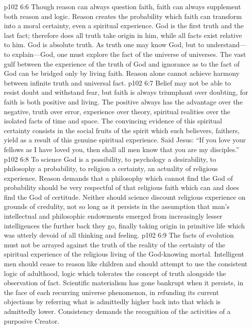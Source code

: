 \pc \vs p102 6:6 Though reason can always question faith, faith can always supplement both reason and logic. Reason creates the probability which faith can transform into a moral certainty, even a spiritual experience. God is the first truth and the last fact; therefore does all truth take origin in him, while all facts exist relative to him. God is absolute truth. As truth one may know God, but to understand---to explain---God, one must explore the fact of the universe of universes. The vast gulf between the experience of the truth of God and ignorance as to the fact of God can be bridged only by living faith. Reason alone cannot achieve harmony between infinite truth and universal fact.
\vs p102 6:7 Belief may not be able to resist doubt and withstand fear, but faith is always triumphant over doubting, for faith is both positive and living. The positive always has the advantage over the negative, truth over error, experience over theory, spiritual realities over the isolated facts of time and space. The convincing evidence of this spiritual certainty consists in the social fruits of the spirit which such believers, faithers, yield as a result of this genuine spiritual experience. Said Jesus: \textcolor{ubdarkred}{“If you love your fellows as I have loved you, then shall all men know that you are my disciples.”}
\pc \vs p102 6:8 To science God is a possibility, to psychology a desirability, to philosophy a probability, to religion a certainty, an actuality of religious experience. Reason demands that a philosophy which cannot find the God of probability should be very respectful of that religious faith which can and does find the God of certitude. Neither should science discount religious experience on grounds of credulity, not so long as it persists in the assumption that man’s intellectual and philosophic endowments emerged from increasingly lesser intelligences the further back they go, finally taking origin in primitive life which was utterly devoid of all thinking and feeling.
\vs p102 6:9 The facts of evolution must not be arrayed against the truth of the reality of the certainty of the spiritual experience of the religious living of the God\hyp{}knowing mortal. Intelligent men should cease to reason like children and should attempt to use the consistent logic of adulthood, logic which tolerates the concept of truth alongside the observation of fact. Scientific materialism has gone bankrupt when it persists, in the face of each recurring universe phenomenon, in refunding its current objections by referring what is admittedly higher back into that which is admittedly lower. Consistency demands the recognition of the activities of a purposive Creator.

